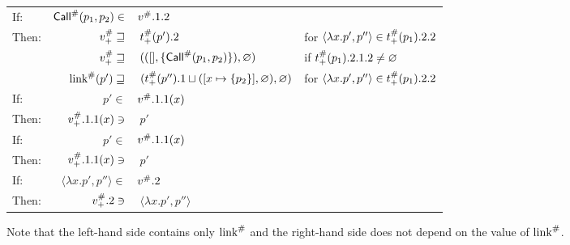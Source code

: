 \begin{center}
\begin{tabular}{|l@{\hskip2pt}r@{\hskip2pt}l@{\hskip2pt}l|}
    If:             & ${\textsf{Call}}^{\#}(p_1,p_2)\in$                         & ${v}^{\#}.1.2$                                                                       &                                                              \\
    Then:           & ${v}^{\#}_+\sqsupseteq$                           & $\:{t}^{\#}_+(p').2$                                                              & for $\langle\lambda x.p',p''\rangle\in{t}^{\#}_+(p_1).2.2$ \\
                    & ${v}^{\#}_+\sqsupseteq$                           & $\:(([],\{{\textsf{Call}}^{\#}(p_1,p_2)\}),\varnothing)$                                      & if ${t}^{\#}_+(p_1).2.1.2\neq\varnothing$                  \\
                    & ${\text{link}}^{\#}(p')\sqsupseteq$                       & $\:({t}^{\#}_+(p'').1\sqcup([x\mapsto\{p_2\}],\varnothing),\varnothing)$          & for $\langle\lambda x.p',p''\rangle\in{t}^{\#}_+(p_1).2.2$ \\
    \hline
    If:             & $p'\in$                                          & ${v}^{\#}.1.1(x)$                                                                    &                                                              \\
    Then:           & ${v}^{\#}_+.1.1(x)\ni$                            & $\:p'$                                                                              &                                                              \\
    \hline
    If:             & $p'\in$                                          & ${v}^{\#}.1.1(x)$                                                                    &                                                              \\
    Then:           & ${v}^{\#}_+.1.1(x)\ni$                            & $\:p'$                                                                              &                                                              \\
    \hline
    If:             & $\langle\lambda x.p',p''\rangle\in$              & ${v}^{\#}.2$                                                                         &                                                              \\
    Then:           & ${v}^{\#}_+.2\ni$                                 & $\:\langle\lambda x.p',p''\rangle$                                                  &                                                              \\
    \hline
  \end{tabular}
\end{center}
Note that the left-hand side contains only ${\text{link}}^{\#}$ and the right-hand side does not depend on the value of ${\text{link}}^{\#}$.

